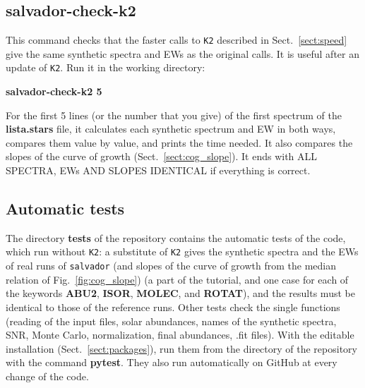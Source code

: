 \documentclass[modern]{aastex701}
\begin{document}
\subsection{salvador-check-k2}
This command checks that the faster calls to \texttt{K2} described in Sect.~\ref{sect:speed} give the same synthetic spectra and EWs as the original calls. It is useful after an update of \texttt{K2}. Run it in the working directory: 
\begin{center}
    {\bf salvador-check-k2 5}
\end{center}
For the first 5 lines (or the number that you give) of the first spectrum of the {\bf lista.stars} file, it calculates each synthetic spectrum and EW in both ways, compares them value by value, and prints the time needed. It also compares the slopes of the curve of growth (Sect.~\ref{sect:cog_slope}). It ends with ALL SPECTRA, EWs AND SLOPES IDENTICAL if everything is correct.

\subsection{Automatic tests}
The directory {\bf tests} of the repository contains the automatic tests of the code, which run without \texttt{K2}: a substitute of \texttt{K2} gives the synthetic spectra and the EWs of real runs of \texttt{salvador} (and slopes of the curve of growth from the median relation of Fig.~\ref{fig:cog_slope}) (a part of the tutorial, and one case for each of the keywords {\bf ABU2}, {\bf ISOR}, {\bf MOLEC}, and {\bf ROTAT}), and the results must be identical to those of the reference runs. Other tests check the single functions (reading of the input files, solar abundances, names of the synthetic spectra, SNR, Monte Carlo, normalization, final abundances, .fit files). With the editable installation (Sect.~\ref{sect:packages}), run them from the directory of the repository with the command {\bf pytest}. They also run automatically on GitHub at every change of the code.
\end{document}
